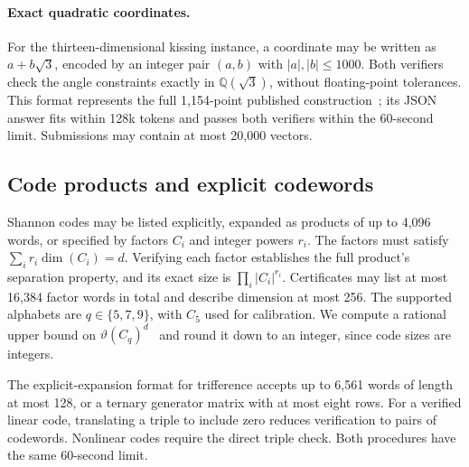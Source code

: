 \paragraph{Exact quadratic coordinates.}
For the thirteen-dimensional kissing instance, a coordinate may be written as $a+b\sqrt3$, encoded by an integer pair $(a,b)$ with $|a|,|b|\le1000$. Both verifiers check the angle constraints exactly in $\mathbb Q(\sqrt3)$, without floating-point tolerances. This format represents the full 1,154-point published construction~\citep{zinoviev1999contact}; its JSON answer fits within 128k tokens and passes both verifiers within the 60-second limit. Submissions may contain at most 20,000 vectors.
\subsection{Code products and explicit codewords}
Shannon codes may be listed explicitly, expanded as products of up to 4,096 words, or specified by factors $C_i$ and integer powers $r_i$. The factors must satisfy $\sum_i r_i\dim(C_i)=d$. Verifying each factor establishes the full product's separation property, and its exact size is $\prod_i|C_i|^{r_i}$. Certificates may list at most 16,384 factor words in total and describe dimension at most 256. The supported alphabets are $q\in\{5,7,9\}$, with $C_5$ used for calibration. We compute a rational upper bound on $\vartheta(C_q)^d$~\citep{lovasz1979shannon} and round it down to an integer, since code sizes are integers.

The explicit-expansion format for trifference accepts up to 6,561 words of length at most 128, or a ternary generator matrix with at most eight rows. For a verified linear code, translating a triple to include zero reduces verification to pairs of codewords. Nonlinear codes require the direct triple check. Both procedures have the same 60-second limit.
\appendixpage
